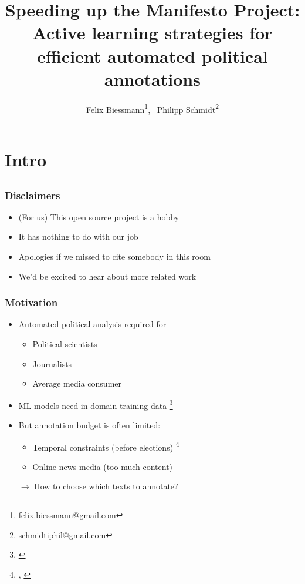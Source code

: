\documentclass[]{beamer}
\institute[]{}
\title[Active Manifesto]{
{
Speeding up the Manifesto Project: \\ Active learning strategies for \\efficient automated political annotations
}}
\author{
Felix Biessmann\thanks{felix.biessmann@gmail.com},~ 
Philipp Schmidt\thanks{schmidtiphil@gmail.com}
}
\date{}
\begin{document}
\begin{frame} 
\titlepage 
\end{frame}	

%
\section{Intro}
\subsection{}

\begin{frame}\frametitle{Disclaimers}
\small
\begin{itemize}
\item (For us) This open source project is a hobby
\item It has nothing to do with our job
\item Apologies if we missed to cite somebody in this room
\item We'd be excited to hear about more related work
\end{itemize}
\end{frame}

\begin{frame}\frametitle{Motivation}
\begin{itemize}[<+->]
\item Automated political analysis required for 
\begin{itemize}
\item Political scientists
\item Journalists
\item Average media consumer
\end{itemize}
\item ML models need in-domain training data \footnote{\cite{Biessmann16}}
\item But annotation budget is often limited:
\begin{itemize}
\item Temporal constraints (before elections) \footnote{\cite{merz2017}, \cite{bronline}}
\item Online news media (too much content) 
\end{itemize}
\item[$\rightarrow$] How to choose which texts to annotate?
\end{itemize}
\end{frame}
\end{document}
